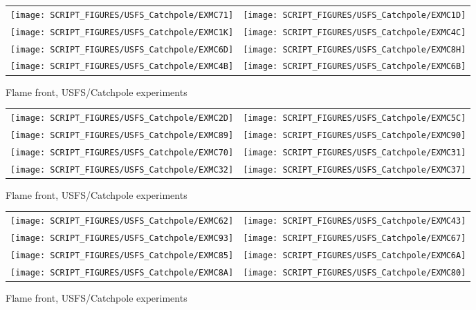 \begin{figure}[p]
\begin{tabular*}{\textwidth}{l@{\extracolsep{\fill}}r}
\texttt{[image: SCRIPT\_FIGURES/USFS\_Catchpole/EXMC71]} &
\texttt{[image: SCRIPT\_FIGURES/USFS\_Catchpole/EXMC1D]} \\
\texttt{[image: SCRIPT\_FIGURES/USFS\_Catchpole/EXMC1K]} &
\texttt{[image: SCRIPT\_FIGURES/USFS\_Catchpole/EXMC4C]} \\
\texttt{[image: SCRIPT\_FIGURES/USFS\_Catchpole/EXMC6D]} &
\texttt{[image: SCRIPT\_FIGURES/USFS\_Catchpole/EXMC8H]} \\
\texttt{[image: SCRIPT\_FIGURES/USFS\_Catchpole/EXMC4B]} &
\texttt{[image: SCRIPT\_FIGURES/USFS\_Catchpole/EXMC6B]} \\
\end{tabular*}
\caption[Flame front, USFS/Catchpole experiments]{Flame front, USFS/Catchpole experiments}
\label{USFS_Catchpole_328}
\end{figure}

\begin{figure}[p]
\begin{tabular*}{\textwidth}{l@{\extracolsep{\fill}}r}
\texttt{[image: SCRIPT\_FIGURES/USFS\_Catchpole/EXMC2D]} &
\texttt{[image: SCRIPT\_FIGURES/USFS\_Catchpole/EXMC5C]} \\
\texttt{[image: SCRIPT\_FIGURES/USFS\_Catchpole/EXMC89]} &
\texttt{[image: SCRIPT\_FIGURES/USFS\_Catchpole/EXMC90]} \\
\texttt{[image: SCRIPT\_FIGURES/USFS\_Catchpole/EXMC70]} &
\texttt{[image: SCRIPT\_FIGURES/USFS\_Catchpole/EXMC31]} \\
\texttt{[image: SCRIPT\_FIGURES/USFS\_Catchpole/EXMC32]} &
\texttt{[image: SCRIPT\_FIGURES/USFS\_Catchpole/EXMC37]} \\
\end{tabular*}
\caption[Flame front, USFS/Catchpole experiments]{Flame front, USFS/Catchpole experiments}
\label{USFS_Catchpole_336}
\end{figure}

\begin{figure}[p]
\begin{tabular*}{\textwidth}{l@{\extracolsep{\fill}}r}
\texttt{[image: SCRIPT\_FIGURES/USFS\_Catchpole/EXMC62]} &
\texttt{[image: SCRIPT\_FIGURES/USFS\_Catchpole/EXMC43]} \\
\texttt{[image: SCRIPT\_FIGURES/USFS\_Catchpole/EXMC93]} &
\texttt{[image: SCRIPT\_FIGURES/USFS\_Catchpole/EXMC67]} \\
\texttt{[image: SCRIPT\_FIGURES/USFS\_Catchpole/EXMC85]} &
\texttt{[image: SCRIPT\_FIGURES/USFS\_Catchpole/EXMC6A]} \\
\texttt{[image: SCRIPT\_FIGURES/USFS\_Catchpole/EXMC8A]} &
\texttt{[image: SCRIPT\_FIGURES/USFS\_Catchpole/EXMC80]} \\
\end{tabular*}
\caption[Flame front, USFS/Catchpole experiments]{Flame front, USFS/Catchpole experiments}
\label{USFS_Catchpole_344}
\end{figure}

